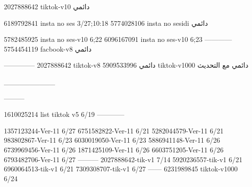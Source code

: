 2027888642 tiktok-v10
دائمي

6189792841 insta no ses
3/27;10:18
5774028106 insta no sesidi
دائمي


5782485925 insta no ses-v10
6;22
6096167091 insta no ses-v10
6;23
------------
5754454119 facbook-v8
دائمي


--------------
2027888642 tiktok-v8
دائمي
5909533996 tiktok-v1000
دائمي مع التحديث

__________

---------

1610025214 list tiktok v5
6/19
------------

1357123244-Ver-11
6/27
6751582822-Ver-11
6/21
5282044579-Ver-11
6/21
983802867-Ver-11
6/23
6030019050-Ver-11
6/23
5886941148-Ver-11
6/26
6739969456-Ver-11
6/26
1871425109-Ver-11
6/26
6603751205-Ver-11
6/26
6793482706-Ver-11
6/27
---------
2027888642-tik-v1
7/14
5920236557-tik-v1
6/21
6960064513-tik-v1
6/21
7309308707-tik-v1
6/27
------
6231989845 tiktok-v1000
6/24
